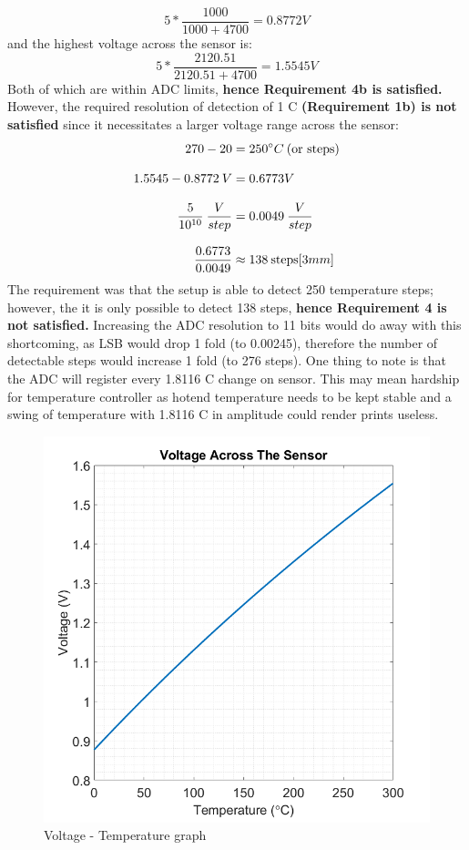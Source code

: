 \begin{equation}
    5*\frac{1000}{1000+4700}= 0.8772 V
\end{equation}
and the highest voltage across the sensor is:
\begin{equation}
    5*\frac{2120.51}{2120.51+4700}= 1.5545 V
\end{equation}
Both of which are within ADC limits, \textbf{hence Requirement 4b is satisfied.} However, the required resolution of detection of 1 \degree C \textbf{(Requirement 1b) is not satisfied} since it necessitates a larger voltage range across the sensor:
\begin{align}
    270 - 20 &= 250 \degree C \: \text{(or steps)}\\[3mm]
    1.5545 - 0.8772 \: V &= 0.6773 V\\[3mm]
    \frac{5}{10^{10}} \: \frac{V}{step} &= 0.0049 \: \frac{V}{step}\\[3mm]
    \frac{0.6773}{0.0049} &\approx 138 \: \text{steps}[3mm]
\end{align}
The requirement was that the setup is able to detect 250 temperature steps; however, the it is only possible to detect 138 steps, \textbf{hence Requirement 4 is not satisfied.} Increasing the ADC resolution to 11 bits would do away with this shortcoming, as LSB would drop 1 fold (to 0.00245), therefore the number of detectable steps would increase 1 fold (to 276 steps). One thing to note is that the ADC will register every 1.8116 \degree C change on sensor. This may mean hardship for temperature controller as hotend temperature needs to be kept stable and a swing of temperature with 1.8116 \degree C in amplitude could render prints useless.
\begin{figure}[H]
    \centering
    \includegraphics[scale=0.4]{../pics/ptc_temp_volt}
    \caption{Voltage - Temperature graph}
\end{figure}
